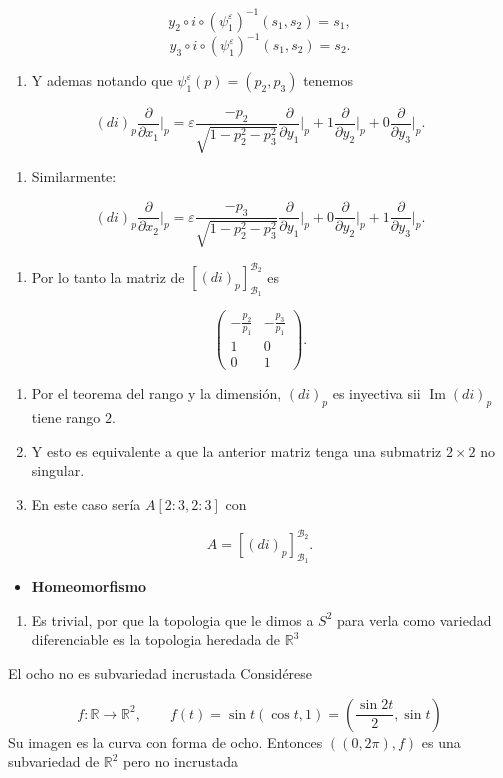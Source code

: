 \begin{bookproof}{}
\[\]
\[
y_2\circ i\circ(\psi_1^\varepsilon)^{-1}(s_1,s_2)=s_1,
\]
\[
y_3\circ i\circ(\psi_1^\varepsilon)^{-1}(s_1,s_2)=s_2.
\]
\begin{enumerate}[start=10]
\item Y ademas notando que $\psi_1^\varepsilon(p)=(p_{2},p_{3})$ tenemos
\end{enumerate}
\[
(di)_p\frac{\partial}{\partial x_1}\bigg|_p=\varepsilon\frac{-p_2}{\sqrt{1-p_2^2-p_3^2}}\frac{\partial}{\partial y_1}\bigg|_p+1\frac{\partial}{\partial y_2}\bigg|_p+0\frac{\partial}{\partial y_3}\bigg|_p.
\]
\begin{enumerate}[start=11]
\item Similarmente:
\end{enumerate}
\[
(di)_p\frac{\partial}{\partial x_2}\bigg|_p=\varepsilon\frac{-p_3}{\sqrt{1-p_2^2-p_3^2}}\frac{\partial}{\partial y_1}\bigg|_p+0\frac{\partial}{\partial y_2}\bigg|_p+1\frac{\partial}{\partial y_3}\bigg|_p.
\]
\begin{enumerate}[start=12]
\item Por lo tanto la matriz de $[(di)_p]^{\mathcal B_2}_{\mathcal B_1}$ es
\end{enumerate}
\[
\begin{pmatrix}-\frac{p_2}{p_1}&-\frac{p_3}{p_1}\\1&0\\0&1\end{pmatrix}.
\]
\begin{enumerate}[start=13]
\item Por el teorema del rango y la dimensión, $(di)_p$ es inyectiva sii $\operatorname{Im}(di)_p$ tiene rango $2$.
\item Y esto es equivalente a que la anterior matriz tenga una submatriz $2\times 2$ no singular.
\item En este caso sería $A[2:3,2:3]$ con
\end{enumerate}
\[
A=[(di)_p]^{\mathcal B_2}_{\mathcal B_1}.
\]
\begin{itemize}
\item \textbf{Homeomorfismo}
\end{itemize}
\begin{enumerate}
\item Es trivial, por que la topologia que le dimos a $S^{2}$ para verla como variedad diferenciable es la topologia heredada de $\mathbb{R}^{3}$
\end{enumerate}
\bookqed
\end{bookproof}
\begin{bookexample}{El ocho no es subvariedad incrustada}
Considérese

\[
f:\mathbb{R}\to\mathbb R^2, \qquad f(t)=\sin t\left(\cos t,1\right)=\left(\frac{\sin 2t}{2},\sin t\right)
\]
Su imagen es la curva con forma de ocho. Entonces $((0,2\pi),f)$ es una subvariedad de $\mathbb{R}^{2}$ pero no incrustada

\end{bookexample}
